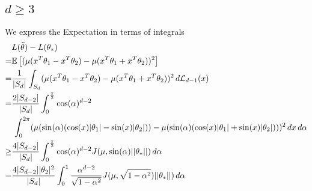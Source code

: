 \subsection{$d\geq 3$}
We express the Expectation in terms of integrals
\begin{align*}
   & L(\tilde{\theta})-L(\theta_*)\\
    =&\mathbb{E}\left[(\mu(x^T\theta_1-x^T\theta_2)-\mu(x^T\theta_1+x^T\theta_2))^2\right]\\
    =&\frac{1}{|S_d|}\int_{S_d}(\mu(x^T\theta_1-x^T\theta_2)-\mu(x^T\theta_1+x^T\theta_2))^2 \,d\mathcal{L}_{d-1}(x)\\
    =& \frac{2|S_{d-2}|}{|S_d|}\int_{0}^{\frac{\pi}{2}}\cos(\alpha)^{d-2}\\
    &\,\int_{0}^{2\pi}(\mu(\sin(\alpha)(\cos(x)|\theta_1|-\sin(x)|\theta_2|))-\mu(\sin(\alpha)(\cos(x)|\theta_1|+\sin(x)|\theta_2|)))^2 \,dx\,d\alpha\\
    \geq& \frac{4|S_{d-2}|}{|S_d|}\int_{0}^{\frac{\pi}{2}}\cos(\alpha)^{d-2}
    J(\mu,\sin(\alpha)||\theta_*||)\,d\alpha\\
    =& \frac{4|S_{d-2}||\theta_2|^2}{|S_d|}\int_{0}^{1}\frac{\alpha^{d-2}}{\sqrt{1-\alpha^2}}
    J(\mu,\sqrt{1-\alpha^2})||\theta_*||)\,d\alpha\\
\end{align*}
